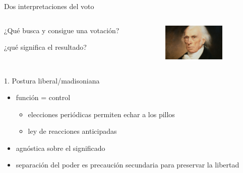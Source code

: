 \documentclass[bigger]{beamer}
\begin{document}
\begin{frame}[label={sec:org48671a3}]{Dos interpretaciones del voto}
\begin{columns}
\begin{column}{0.6\columnwidth}
¿Qué busca y consigue una votación?

¿qué significa el resultado?
\end{column}

\begin{column}{0.4\columnwidth}
\includegraphics[width=3cm]{./pics/madison.jpg}


\bigskip \pause
\end{column}
\end{columns}
\begin{block}{1. Postura liberal/madisoniana}
\begin{itemize}
\item función = control
\begin{itemize}
\item elecciones periódicas permiten echar a los pillos
\item ley de reacciones anticipadas
\end{itemize}
\item agnóstica sobre el significado
\item separación del poder es precaución secundaria para preservar la libertad
\end{itemize}
\end{block}
\end{frame}
\end{document}
